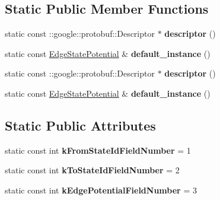 \subsection*{Static Public Member Functions}
\begin{DoxyCompactItemize}
\item 
\hypertarget{classgraph_1_1EdgeStatePotential_a3f80b4ecaf2002b2f15ceeacc886b3f8}{
static const ::google::protobuf::Descriptor $\ast$ {\bfseries descriptor} ()}
\label{classgraph_1_1EdgeStatePotential_a3f80b4ecaf2002b2f15ceeacc886b3f8}

\item 
\hypertarget{classgraph_1_1EdgeStatePotential_a4e8c1d4812d4419c4304cfb9013ad7ec}{
static const \hyperlink{classgraph_1_1EdgeStatePotential}{EdgeStatePotential} \& {\bfseries default\_\-instance} ()}
\label{classgraph_1_1EdgeStatePotential_a4e8c1d4812d4419c4304cfb9013ad7ec}

\item 
\hypertarget{classgraph_1_1EdgeStatePotential_a2256743e6b7a1cb3df066e83d437dd3b}{
static const ::google::protobuf::Descriptor $\ast$ {\bfseries descriptor} ()}
\label{classgraph_1_1EdgeStatePotential_a2256743e6b7a1cb3df066e83d437dd3b}

\item 
\hypertarget{classgraph_1_1EdgeStatePotential_a96e42fc32c65aa17a1482bd1a0d24ed3}{
static const \hyperlink{classgraph_1_1EdgeStatePotential}{EdgeStatePotential} \& {\bfseries default\_\-instance} ()}
\label{classgraph_1_1EdgeStatePotential_a96e42fc32c65aa17a1482bd1a0d24ed3}

\end{DoxyCompactItemize}
\subsection*{Static Public Attributes}
\begin{DoxyCompactItemize}
\item 
\hypertarget{classgraph_1_1EdgeStatePotential_a74b8281941c70867a54fa40620a3e571}{
static const int {\bfseries kFromStateIdFieldNumber} = 1}
\label{classgraph_1_1EdgeStatePotential_a74b8281941c70867a54fa40620a3e571}

\item 
\hypertarget{classgraph_1_1EdgeStatePotential_a88d6891e1cf9539078473b830215f721}{
static const int {\bfseries kToStateIdFieldNumber} = 2}
\label{classgraph_1_1EdgeStatePotential_a88d6891e1cf9539078473b830215f721}

\item 
\hypertarget{classgraph_1_1EdgeStatePotential_a25bac96c29c696a2ba0e8a247f07dead}{
static const int {\bfseries kEdgePotentialFieldNumber} = 3}
\label{classgraph_1_1EdgeStatePotential_a25bac96c29c696a2ba0e8a247f07dead}

\end{DoxyCompactItemize}
